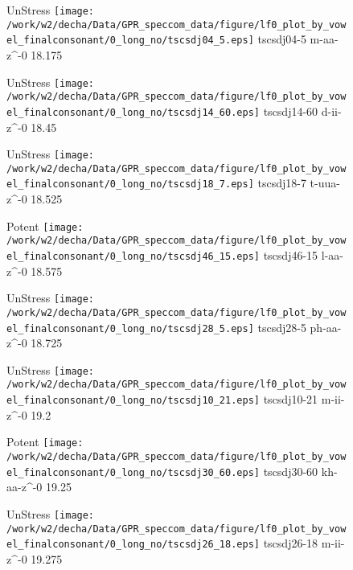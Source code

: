\documentclass{article}
\begin{document}
\begin{figure}[t]
\begin{minipage}[b]{.24\textwidth}
UnStress
\centering
\texttt{[image: /work/w2/decha/Data/GPR\_speccom\_data/figure/lf0\_plot\_by\_vowel\_finalconsonant/0\_long\_no/tscsdj04\_5.eps]}
tscsdj04-5 m-aa-z\textasciicircum-0 18.175
\end{minipage}
\begin{minipage}[b]{.24\textwidth}
UnStress
\centering
\texttt{[image: /work/w2/decha/Data/GPR\_speccom\_data/figure/lf0\_plot\_by\_vowel\_finalconsonant/0\_long\_no/tscsdj14\_60.eps]}
tscsdj14-60 d-ii-z\textasciicircum-0 18.45
\end{minipage}
\begin{minipage}[b]{.24\textwidth}
UnStress
\centering
\texttt{[image: /work/w2/decha/Data/GPR\_speccom\_data/figure/lf0\_plot\_by\_vowel\_finalconsonant/0\_long\_no/tscsdj18\_7.eps]}
tscsdj18-7 t-uua-z\textasciicircum-0 18.525
\end{minipage}
\begin{minipage}[b]{.24\textwidth}
\colorbox{Apricot}{Potent}
\centering
\texttt{[image: /work/w2/decha/Data/GPR\_speccom\_data/figure/lf0\_plot\_by\_vowel\_finalconsonant/0\_long\_no/tscsdj46\_15.eps]}
tscsdj46-15 l-aa-z\textasciicircum-0 18.575
\end{minipage}
\end{figure}
\clearpage
\begin{figure}[t]
\begin{minipage}[b]{.24\textwidth}
UnStress
\centering
\texttt{[image: /work/w2/decha/Data/GPR\_speccom\_data/figure/lf0\_plot\_by\_vowel\_finalconsonant/0\_long\_no/tscsdj28\_5.eps]}
tscsdj28-5 ph-aa-z\textasciicircum-0 18.725
\end{minipage}
\begin{minipage}[b]{.24\textwidth}
UnStress
\centering
\texttt{[image: /work/w2/decha/Data/GPR\_speccom\_data/figure/lf0\_plot\_by\_vowel\_finalconsonant/0\_long\_no/tscsdj10\_21.eps]}
tscsdj10-21 m-ii-z\textasciicircum-0 19.2
\end{minipage}
\begin{minipage}[b]{.24\textwidth}
\colorbox{Apricot}{Potent}
\centering
\texttt{[image: /work/w2/decha/Data/GPR\_speccom\_data/figure/lf0\_plot\_by\_vowel\_finalconsonant/0\_long\_no/tscsdj30\_60.eps]}
tscsdj30-60 kh-aa-z\textasciicircum-0 19.25
\end{minipage}
\begin{minipage}[b]{.24\textwidth}
UnStress
\centering
\texttt{[image: /work/w2/decha/Data/GPR\_speccom\_data/figure/lf0\_plot\_by\_vowel\_finalconsonant/0\_long\_no/tscsdj26\_18.eps]}
tscsdj26-18 m-ii-z\textasciicircum-0 19.275
\end{minipage}
\end{figure}
\end{document}
